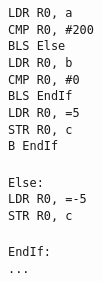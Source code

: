 \documentclass{article}
\begin{document}
\begin{enumerate}
\begin{multicols}{2}
\begin{enumerate}
                \texttt{LDR R0, a   \\
                CMP R0, \#200   \\
                BLS Else    \\
                LDR R0, b   \\
                CMP R0, \#0 \\
                BLS EndIf   \\
                LDR R0, =5 \\
                STR R0, c   \\
                B   EndIf   \\
                            \\
                Else:       \\
                LDR R0, =-5\\
                STR R0, c   \\ 
                            \\
                EndIf:      \\
                ...         \\
                }
        \end{enumerate}
        \end{multicols}
        

\end{enumerate}
\end{document}

